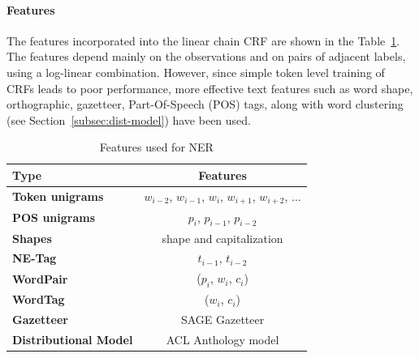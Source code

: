 \paragraph{Features}%
The features incorporated into the linear chain CRF are shown in the Table~\ref{tab:features}. The features depend mainly on the observations and on pairs of adjacent labels, using a log-linear combination. However, since simple token level training of CRFs leads to poor performance, more effective text features such as word shape, orthographic, gazetteer, Part-Of-Speech (POS) tags, along with word clustering (see Section~\ref{subsec:dist-model}) have been used.
%
\begin{table}
\small
  \caption{Features used for NER}
  \label{tab:features}
  \center
  \begin{tabular}{lc}
    \toprule
  \textbf{Type} &  \textbf{Features} \\
    \midrule
\textbf{Token unigrams} 	   &    $w_{i-2}$, $w_{i-1}$, $w_{i}$, $w_{i+1}$, $w_{i+2}$, ... \\

\textbf{POS unigrams} 	   &    $p_{i}$, $p_{i-1}$, $p_{i-2}$ \\

\textbf{Shapes}	   &    shape and capitalization \\
    \midrule
\textbf{NE-Tag}	   &    $t_{i-1}$, $t_{i-2}$ \\
      \midrule
\textbf{WordPair}	 &   
($p_{i}$, $w_{i}$, $c_{i}$) \\

\textbf{WordTag}	 &   
($w_{i}$, $c_{i}$) \\

    \midrule
\textbf{Gazetteer}	   &    SAGE Gazetteer \\
    \midrule
    \textbf{Distributional Model}	   &    ACL Anthology model \\
      \bottomrule
   \end{tabular}
\end{table}

